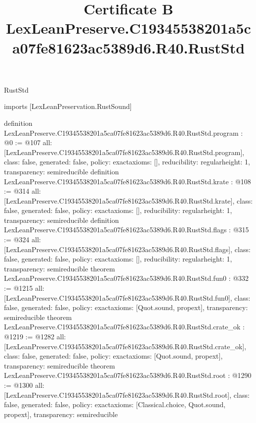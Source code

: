 \begin{lexlean}{RustStd}
\title{Certificate B LexLeanPreserve.C19345538201a5ca07fe81623ac5389d6.R40.RustStd}
\begin{coremodule}
imports [LexLeanPreservation.RustSound]

definition LexLeanPreserve.C19345538201a5ca07fe81623ac5389d6.R40.RustStd.program : @0 := @107 {
  all: [LexLeanPreserve.C19345538201a5ca07fe81623ac5389d6.R40.RustStd.program],
  class: false,
  generated: false,
  policy: exact{axioms: []},
  reducibility: regular{height: 1},
  transparency: semireducible
}
definition LexLeanPreserve.C19345538201a5ca07fe81623ac5389d6.R40.RustStd.krate : @108 := @314 {
  all: [LexLeanPreserve.C19345538201a5ca07fe81623ac5389d6.R40.RustStd.krate],
  class: false,
  generated: false,
  policy: exact{axioms: []},
  reducibility: regular{height: 1},
  transparency: semireducible
}
definition LexLeanPreserve.C19345538201a5ca07fe81623ac5389d6.R40.RustStd.flags : @315 := @324 {
  all: [LexLeanPreserve.C19345538201a5ca07fe81623ac5389d6.R40.RustStd.flags],
  class: false,
  generated: false,
  policy: exact{axioms: []},
  reducibility: regular{height: 1},
  transparency: semireducible
}
theorem LexLeanPreserve.C19345538201a5ca07fe81623ac5389d6.R40.RustStd.fun0 : @332 := @1215 {
  all: [LexLeanPreserve.C19345538201a5ca07fe81623ac5389d6.R40.RustStd.fun0],
  class: false,
  generated: false,
  policy: exact{axioms: [Quot.sound, propext]},
  transparency: semireducible
}
theorem LexLeanPreserve.C19345538201a5ca07fe81623ac5389d6.R40.RustStd.crate_ok : @1219 := @1282 {
  all: [LexLeanPreserve.C19345538201a5ca07fe81623ac5389d6.R40.RustStd.crate_ok],
  class: false,
  generated: false,
  policy: exact{axioms: [Quot.sound, propext]},
  transparency: semireducible
}
theorem LexLeanPreserve.C19345538201a5ca07fe81623ac5389d6.R40.RustStd.root : @1290 := @1300 {
  all: [LexLeanPreserve.C19345538201a5ca07fe81623ac5389d6.R40.RustStd.root],
  class: false,
  generated: false,
  policy: exact{axioms: [Classical.choice, Quot.sound, propext]},
  transparency: semireducible
}


\end{coremodule}
\end{lexlean}
